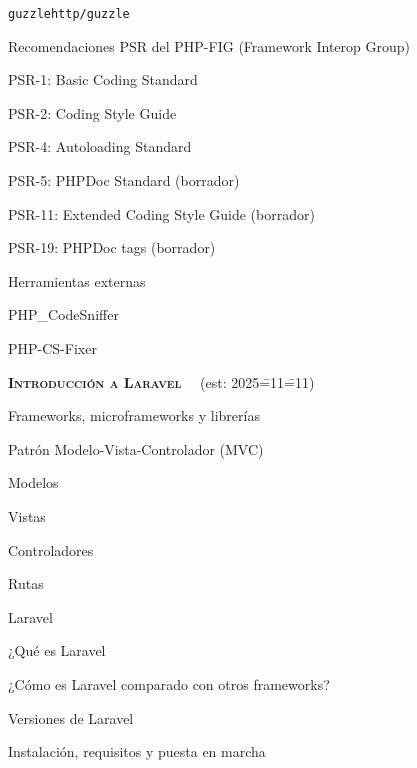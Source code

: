 \begin{longenum}
\begin{longenum}
\begin{longenum}
            \item \texttt{guzzlehttp/guzzle}
        \end{longenum}
        \item Recomendaciones PSR del PHP-FIG (Framework Interop Group) \opcional\
        \begin{longenum}
            \item PSR-1: Basic Coding Standard
            \item PSR-2: Coding Style Guide
            \item PSR-4: Autoloading Standard
            \item PSR-5: PHPDoc Standard (borrador)
            \item PSR-11: Extended Coding Style Guide (borrador)
            \item PSR-19: PHPDoc tags (borrador)
            \item Herramientas externas \opcional\
            \begin{longenum}
                \item PHP\_CodeSniffer
                \item PHP-CS-Fixer
            \end{longenum}
        \end{longenum}
    \end{longenum}
    \item \textbf{\textsc{Introducción a Laravel}} \ev1\ \ra5\ (est: 2025\==11\==11)
    \begin{longenum}
        \item Frameworks, microframeworks y librerías
        \item Patrón Modelo-Vista-Controlador (MVC)
        \begin{longenum}
            \item Modelos
            \item Vistas
            \item Controladores
            \item Rutas
        \end{longenum}
        \item Laravel
        \begin{longenum}
            \item ¿Qué es Laravel
            \item ¿Cómo es Laravel comparado con otros frameworks?
            \item Versiones de Laravel
        \end{longenum}
        \item Instalación, requisitos y puesta en marcha

\end{longenum}
\end{longenum}
